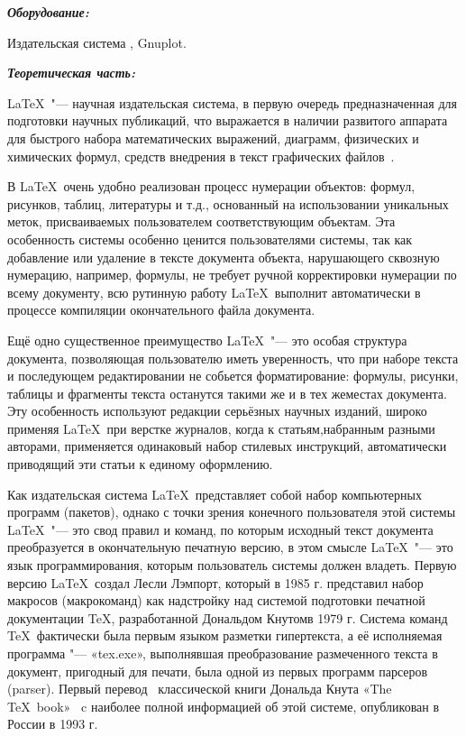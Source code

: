 
{\bfseries\itshape Оборудование:}
\label{sec:equipments}
Издательская система \LaTeXe, Gnuplot.


{\bfseries\itshape Теоретическая часть:}
\label{sec:theoretic_part}
\LaTeX\ "--- научная издательская система, в первую очередь предназначенная для подготовки научных публикаций, что выражается в наличии развитого аппарата для быстрого набора математических выражений, диаграмм, физических и химических формул, средств внедрения в текст графических файлов~\cite{nasyrov:book:2019:01}.

В \LaTeX\ очень удобно реализован процесс нумерации объектов: формул, рисунков, таблиц, литературы и т.д., основанный на использовании уникальных меток, присваиваемых пользователем соответствующим объектам. Эта особенность системы особенно ценится пользователями системы, так как добавление или удаление в тексте документа объекта, нарушающего сквозную нумерацию, например, формулы, не требует ручной корректировки нумерации по всему документу, всю рутинную работу \LaTeX\ выполнит автоматически в процессе компиляции окончательного файла документа.

Ещё одно существенное преимущество \LaTeX\ "--- это особая структура документа, позволяющая пользователю иметь уверенность, что при наборе текста и последующем редактировании не собьется форматирование: формулы, рисунки, таблицы и фрагменты текста останутся такими же и в тех жеместах документа. Эту особенность используют редакции серьёзных научных изданий, широко применяя \LaTeX\ при верстке журналов, когда к статьям,набранным разными авторами, применяется одинаковый набор стилевых инструкций, автоматически приводящий эти статьи к единому оформлению.

Как издательская система \LaTeX\ представляет собой набор компьютерных программ (пакетов), однако с точки зрения конечного пользователя этой системы \LaTeX\ "--- это свод правил и команд, по которым исходный текст документа преобразуется в окончательную печатную версию, в этом смысле \LaTeX\ "--- это язык программирования, которым пользователь системы должен владеть. Первую версию \LaTeX\ создал Лесли Лэмпорт, который в 1985 г. представил набор макросов (макрокоманд) как надстройку над системой подготовки печатной документации \TeX, разработанной Дональдом Кнутомв 1979 г. Система команд \TeX\ фактически была первым языком разметки гипертекста, а её исполняемая программа "--- «tex.exe», выполнявшая преобразование размеченного текста в документ, пригодный для печати, была одной из первых программ парсеров (parser). Первый перевод~\cite{knut:book:1993:01} классической книги Дональда Кнута «The \TeX\ book»~\cite{knut:book:1984:01} c наиболее полной информацией об этой системе, опубликован в России в 1993 г.


